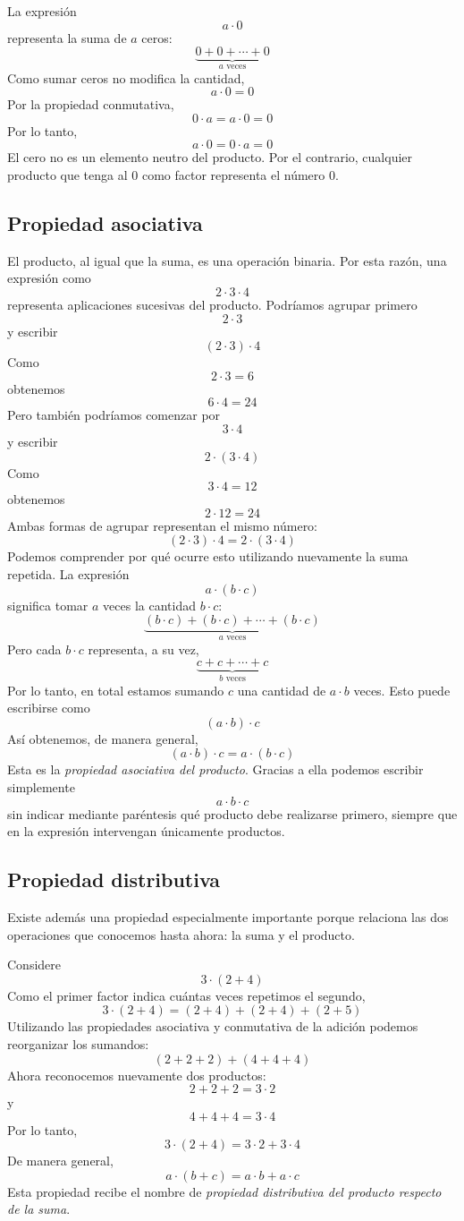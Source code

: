 La expresión
\[
a\cdot0
\]
representa la suma de \(a\) ceros:
\[
\underbrace{0+0+\cdots+0}_{a\text{ veces}}
\]
Como sumar ceros no modifica la cantidad,
\[
a\cdot0=0
\]
Por la propiedad conmutativa,
\[
0\cdot a=a\cdot0=0
\]
Por lo tanto,
\[
a\cdot0=0\cdot a=0
\]
El cero no es un elemento neutro del producto. Por el contrario, cualquier producto que tenga al \(0\) como factor representa el número \(0\).

\subsection{Propiedad asociativa}

El producto, al igual que la suma, es una operación binaria. Por esta razón, una expresión como
\[
2\cdot3\cdot4
\]
representa aplicaciones sucesivas del producto.
Podríamos agrupar primero
\[
2\cdot3
\]
y escribir
\[
(2\cdot3)\cdot4
\]
Como
\[
2\cdot3=6
\]
obtenemos
\[
6\cdot4=24
\]
Pero también podríamos comenzar por
\[
3\cdot4
\]
y escribir
\[
2\cdot(3\cdot4)
\]
Como
\[
3\cdot4=12
\]
obtenemos
\[
2\cdot12=24
\]
Ambas formas de agrupar representan el mismo número:
\[
(2\cdot3)\cdot4
=
2\cdot(3\cdot4)
\]
Podemos comprender por qué ocurre esto utilizando nuevamente la suma repetida.
La expresión
\[
a\cdot(b\cdot c)
\]
significa tomar \(a\) veces la cantidad \(b\cdot c\):
\[
\underbrace{(b\cdot c)+(b\cdot c)+\cdots+(b\cdot c)}_{a\text{ veces}}
\]
Pero cada \(b\cdot c\) representa, a su vez,
\[
\underbrace{c+c+\cdots+c}_{b\text{ veces}}
\]
Por lo tanto, en total estamos sumando \(c\) una cantidad de \(a\cdot b\) veces. Esto puede escribirse como
\[
(a\cdot b)\cdot c
\]
Así obtenemos, de manera general,
\[
(a\cdot b)\cdot c
=
a\cdot(b\cdot c)
\]
Esta es la \emph{propiedad asociativa del producto}.
Gracias a ella podemos escribir simplemente
\[
a\cdot b\cdot c
\]
sin indicar mediante paréntesis qué producto debe realizarse primero, siempre que en la expresión intervengan únicamente productos.

\subsection{Propiedad distributiva}

Existe además una propiedad especialmente importante porque relaciona las dos operaciones que conocemos hasta ahora: la suma y el producto.

Considere
\[
3\cdot(2+4)
\]
Como el primer factor indica cuántas veces repetimos el segundo,
\[
3\cdot(2+4)
=
(2+4)+(2+4)+(2+5)
\]
Utilizando las propiedades asociativa y conmutativa de la adición podemos reorganizar los sumandos:
\[
(2+2+2)+(4+4+4)
\]
Ahora reconocemos nuevamente dos productos:
\[
2+2+2=3\cdot2
\]
y
\[
4+4+4=3\cdot4
\]
Por lo tanto,
\[
3\cdot(2+4)
=
3\cdot2+3\cdot4
\]
De manera general,
\[
a\cdot(b+c)
=
a\cdot b+a\cdot c
\]
Esta propiedad recibe el nombre de \emph{propiedad distributiva del producto respecto de la suma}.

